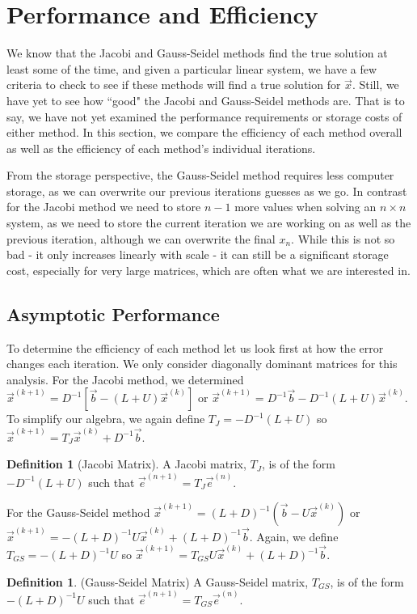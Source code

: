 \documentclass[12pt,letterpaper]{article}
\theoremstyle{definition}
\newtheorem{defn}[thm]{Definition}
\begin{document}
\section{Performance and Efficiency}

We know that the Jacobi and Gauss-Seidel methods find the true solution at least some of the time, and given a particular linear system, we have a few criteria to check to see if these methods will find a true solution for $\vec{x}$. Still, we have yet to see how ``good" the Jacobi and Gauss-Seidel methods are. That is to say, we have not yet examined the performance requirements or storage costs of either method. In this section, we compare the efficiency of each method overall as well as the efficiency of each method's individual iterations. 

From the storage perspective, the Gauss-Seidel method  requires less computer storage, as we can overwrite our previous iterations guesses as we go. In contrast for the Jacobi method we need to store $n-1$ more values when solving an $n\times n$ system, as we need to store the current iteration we are working on as well as the previous iteration, although we can overwrite the final $x_n$. While this is not so bad - it only increases linearly with scale - it can still be a significant storage cost, especially for very large matrices, which are often what we are interested in. 

\subsection{Asymptotic Performance}
To determine the efficiency of each method let us look first at how the error changes each iteration. We only consider diagonally dominant matrices for this analysis. For the Jacobi method, we determined $\vec{x}^{(k+1)}=D^{-1}\left[\vec{b}-(L+U)\vec{x}^{(k)}\right]$ or $\vec{x}^{(k+1)}=D^{-1}\vec{b}-D^{-1}(L+U)\vec{x}^{(k)}$. To simplify our algebra, we again define $T_J=-D^{-1}(L+U)$ so $\vec{x}^{(k+1)} = T_J\vec{x}^{(k)}+D^{-1}\vec{b}$.%
\begin{defn}[Jacobi Matrix]
A Jacobi matrix, $T_J$, is of the form $-D^{-1}(L+U)$ such that $\vec{e}^{(n+1)}=T_J\vec{e}^{(n)}$.
\end{defn}

For the Gauss-Seidel method $\vec{x}^{(k+1)} = (L+D)^{-1}\left(\vec{b}-U\vec{x}^{(k)}\right)$ or $\vec{x}^{(k+1)} = -(L+D)^{-1}U\vec{x}^{(k)} + (L+D)^{-1}\vec{b}$. Again, we define $T_{GS}=-(L+D)^{-1}U$ so $\vec{x}^{(k+1)} = T_{GS}U\vec{x}^{(k)} + (L+D)^{-1}\vec{b}$.%
\begin{defn}(Gauss-Seidel Matrix)
A Gauss-Seidel matrix, $T_{GS}$, is of the form $-(L+D)^{-1}U$ such that $\vec{e}^{(n+1)}=T_{GS}\vec{e}^{(n)}$.
\end{defn}
\end{document}
